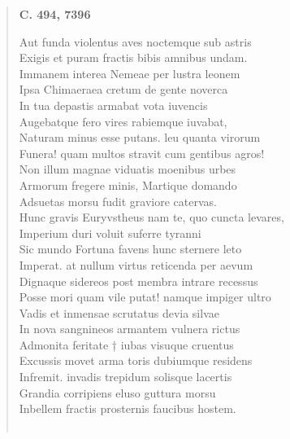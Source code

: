\documentclass[11pt, a4paper]{report}
\begin{document}
\begin{verse}
    \begin{center} \textbf{C. 494, 7396} \end{center} \marginpar{[55]} Aut funda violentus aves noctemque sub astris \\ Exigis et puram fractis bibis amnibus undam. \\ Immanem interea Nemeae per lustra leonem \\ Ipsa Chimaeraea cretum de gente noverca \\ In tua depastis armabat vota iuvencis \\ Augebatque fero vires rabiemque iuvabat, \\ Naturam minus esse putans.  \lbrack leu \rbrack  quanta virorum \\ Funera! quam multos stravit cum gentibus agros! \\ Non illum magnae viduatis moenibus urbes \\ Armorum fregere minis, Martique domando \\ Adsuetas morsu fudit graviore catervas. \\ Hunc gravis Euryvstheus nam te, quo cuncta levares, \\ Imperium duri voluit suferre tyranni \\ Sic mundo Fortuna favens hunc sternere leto \\ Imperat. at nullum virtus reticenda per aevum \\ Dignaque sidereos post membra intrare recessus \\ Posse mori quam vile putat! namque impiger ultro \\ Vadis  \lbrack et \rbrack  inmensae scrutatus devia silvae \\ In nova sangnineos armantem vulnera rictus \\ Admonita feritate † iubas visuque cruentus \\ Excussis movet arma toris dubiumque residens \\ Infremit. invadis trepidum solisque lacertis \\ Grandia corripiens eluso guttura morsu \\ Inbellem fractis prosternis faucibus hostem. \\ 
        ﻿\pagebreak 

\end{verse}
\end{document}
